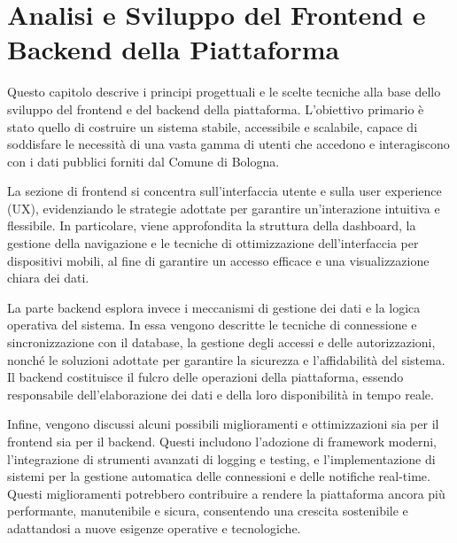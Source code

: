\clearpage{\pagestyle{empty}\cleardoublepage}
\chapter{Analisi e Sviluppo del Frontend e Backend della Piattaforma}

Questo capitolo descrive i principi progettuali e le scelte tecniche alla base dello sviluppo del frontend e del backend della piattaforma. L'obiettivo primario è stato quello di costruire un sistema stabile, accessibile e scalabile, capace di soddisfare le necessità di una vasta gamma di utenti che accedono e interagiscono con i dati pubblici forniti dal Comune di Bologna.

La sezione di frontend si concentra sull’interfaccia utente e sulla user experience (UX), evidenziando le strategie adottate per garantire un'interazione intuitiva e flessibile. In particolare, viene approfondita la struttura della dashboard, la gestione della navigazione e le tecniche di ottimizzazione dell’interfaccia per dispositivi mobili, al fine di garantire un accesso efficace e una visualizzazione chiara dei dati.

La parte backend esplora invece i meccanismi di gestione dei dati e la logica operativa del sistema. In essa vengono descritte le tecniche di connessione e sincronizzazione con il database, la gestione degli accessi e delle autorizzazioni, nonché le soluzioni adottate per garantire la sicurezza e l'affidabilità del sistema. Il backend costituisce il fulcro delle operazioni della piattaforma, essendo responsabile dell'elaborazione dei dati e della loro disponibilità in tempo reale.

Infine, vengono discussi alcuni possibili miglioramenti e ottimizzazioni sia per il frontend sia per il backend. Questi includono l'adozione di framework moderni, l’integrazione di strumenti avanzati di logging e testing, e l'implementazione di sistemi per la gestione automatica delle connessioni e delle notifiche real-time. Questi miglioramenti potrebbero contribuire a rendere la piattaforma ancora più performante, manutenibile e sicura, consentendo una crescita sostenibile e adattandosi a nuove esigenze operative e tecnologiche.


